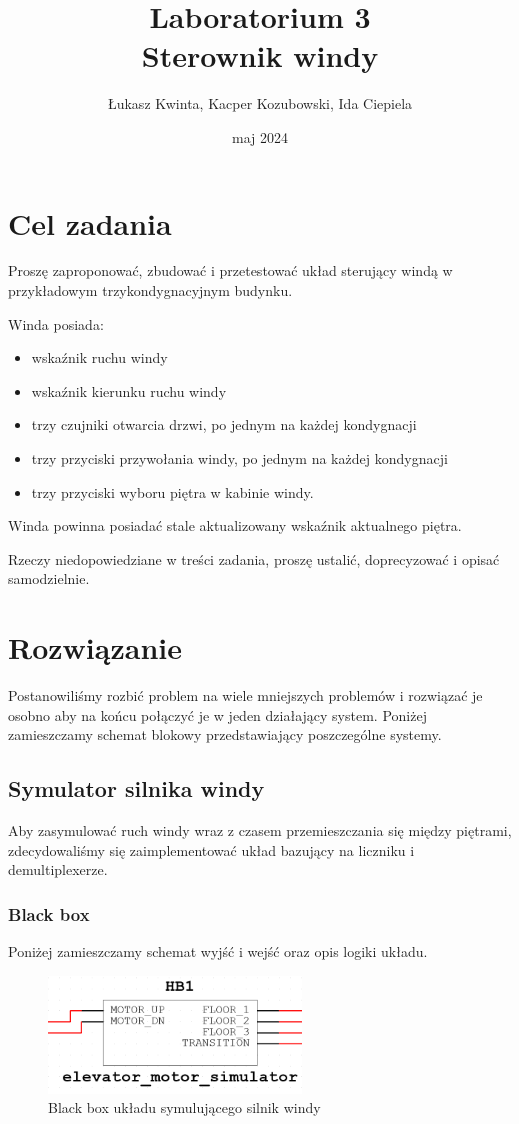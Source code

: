 \documentclass[a4paper]{article}
\title{\fontsize{30pt}{30pt}\selectfont Laboratorium 3 \\ Sterownik windy}
\author{\fontsize{20pt}{20pt}\selectfont Łukasz Kwinta, Kacper Kozubowski, Ida Ciepiela}
\date{maj 2024}
\begin{document}
\maketitle
\pagebreak
\large
\tableofcontents

\pagebreak
\section{Cel zadania}
\Large
Proszę zaproponować, zbudować i przetestować układ sterujący windą w przykładowym trzykondygnacyjnym budynku.

Winda posiada:
\begin{itemize}
    \item wskaźnik ruchu windy
    \item wskaźnik kierunku ruchu windy
    \item trzy czujniki otwarcia drzwi, po jednym na każdej kondygnacji
    \item trzy przyciski przywołania windy, po jednym na każdej kondygnacji
    \item trzy przyciski wyboru piętra w kabinie windy.
\end{itemize}

Winda powinna posiadać stale aktualizowany wskaźnik aktualnego piętra.

Rzeczy niedopowiedziane w treści zadania, proszę ustalić, doprecyzować i opisać samodzielnie.

\section{Rozwiązanie}
Postanowiliśmy rozbić problem na wiele mniejszych problemów i rozwiązać je osobno aby 
na końcu połączyć je w jeden działający system. Poniżej zamieszczamy schemat blokowy 
przedstawiający poszczególne systemy.

\subsection{Symulator silnika windy}
Aby zasymulować ruch windy wraz z czasem przemieszczania się między piętrami, zdecydowaliśmy się 
zaimplementować układ bazujący na liczniku i demultiplexerze.

\subsubsection{Black box}
Poniżej zamieszczamy schemat wyjść i wejść oraz opis logiki układu.
\begin{figure}[H]
    \centering
    \includegraphics[width=0.6\textwidth]{elevator_motor_simulator.png}
    \caption{Black box układu symulującego silnik windy}
\end{figure}
\end{document}
